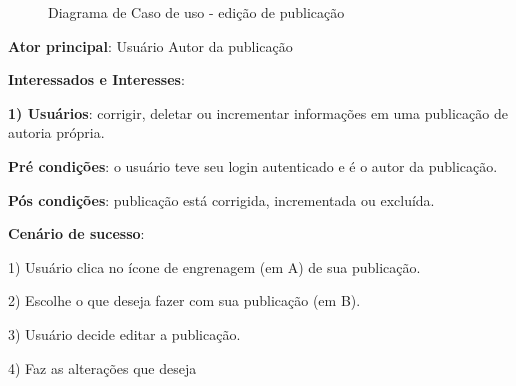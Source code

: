 \documentclass[12pt]{article}
\begin{document}
  \begin{figure}[!htb]
    \caption{\label{fig:diagUseCase06} Diagrama de Caso de uso - edição de publicação}
  \end{figure}

\textbf{Ator principal}: Usuário Autor da publicação

\textbf{Interessados e Interesses}:

\textbf{1) Usuários}: corrigir, deletar ou incrementar informações em uma publicação de autoria própria.

\textbf{Pré condições}: o usuário teve seu login autenticado e é o autor da publicação.

\textbf{Pós condições}: publicação está corrigida, incrementada ou excluída.

\textbf{Cenário de sucesso}:

1) Usuário clica no ícone de engrenagem (em A) de sua publicação.

2) Escolhe o que deseja fazer com sua publicação (em B).

3) Usuário decide editar a publicação.

4) Faz as alterações que deseja
\end{document}
